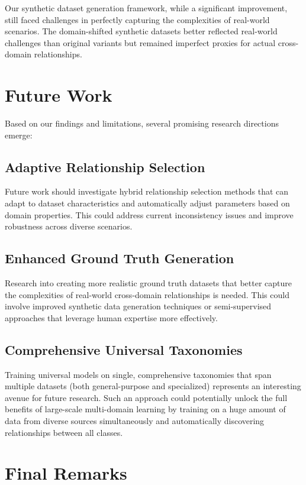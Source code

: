 Our synthetic dataset generation framework, while a significant improvement,
still faced challenges in perfectly capturing the complexities of real-world scenarios.
The domain-shifted synthetic datasets better reflected real-world challenges
than original variants but remained imperfect proxies for actual cross-domain relationships.

\section{Future Work}

Based on our findings and limitations, several promising research directions emerge:

\subsection{Adaptive Relationship Selection}

Future work should investigate hybrid relationship selection methods
that can adapt to dataset characteristics
and automatically adjust parameters based on domain properties.
This could address current inconsistency issues
and improve robustness across diverse scenarios.

\subsection{Enhanced Ground Truth Generation}

Research into creating more realistic ground truth datasets
that better capture the complexities of real-world cross-domain relationships is needed.
This could involve improved synthetic data generation techniques
or semi-supervised approaches that leverage human expertise more effectively.

\subsection{Comprehensive Universal Taxonomies}

Training universal models on single, comprehensive taxonomies
that span multiple datasets (both general-purpose and specialized)
represents an interesting avenue for future research.
Such an approach could potentially unlock the full benefits
of large-scale multi-domain learning by training on
a huge amount of data from diverse sources simultaneously
and automatically discovering relationships between all classes.

\section{Final Remarks}

